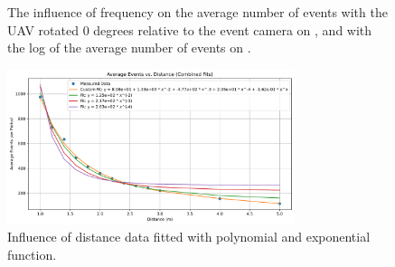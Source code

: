 \begin{figure}[htbp]
	\centering
	\caption{
  The influence of frequency on the average number of events with the UAV rotated 0 degrees relative to the event camera on , and with the log of the average number of events on .
  }
	\label{fig:freqs}
\end{figure}

\begin{figure}[htbp]
	\centering
	\includegraphics[width=0.75\textwidth]{./fig/plots/fit.pdf}
	\caption{Influence of distance data fitted with polynomial and exponential function.}
	\label{fig:fit1}
  \end{figure}

